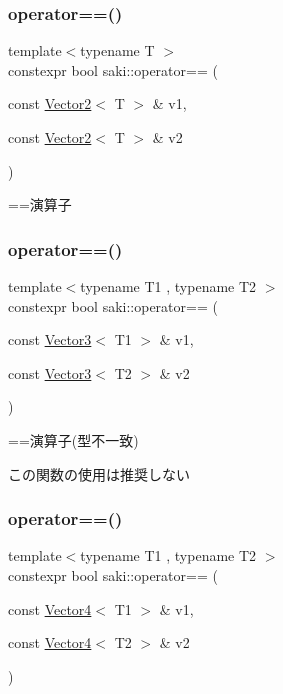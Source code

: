 \subsubsection{\texorpdfstring{operator==()}{operator==()}\hspace{0.1cm}{\footnotesize\ttfamily [5/10]}}
{\footnotesize\ttfamily template$<$typename T $>$ \\
constexpr bool saki\+::operator== (\begin{DoxyParamCaption}\item[{const \mbox{\hyperlink{classsaki_1_1_vector2}{Vector2}}$<$ T $>$ \&}]{v1,  }\item[{const \mbox{\hyperlink{classsaki_1_1_vector2}{Vector2}}$<$ T $>$ \&}]{v2 }\end{DoxyParamCaption})}



==演算子 

\mbox{\label{namespacesaki_a487f0b513be6d4a0aecafeec28b6fc69}} 
\subsubsection{\texorpdfstring{operator==()}{operator==()}\hspace{0.1cm}{\footnotesize\ttfamily [6/10]}}
{\footnotesize\ttfamily template$<$typename T1 , typename T2 $>$ \\
constexpr bool saki\+::operator== (\begin{DoxyParamCaption}\item[{const \mbox{\hyperlink{classsaki_1_1_vector3}{Vector3}}$<$ T1 $>$ \&}]{v1,  }\item[{const \mbox{\hyperlink{classsaki_1_1_vector3}{Vector3}}$<$ T2 $>$ \&}]{v2 }\end{DoxyParamCaption})}



==演算子(型不一致) 

この関数の使用は推奨しない \mbox{\label{namespacesaki_a3c0f3a38ce313956032cd123f702b7a5}} 
\subsubsection{\texorpdfstring{operator==()}{operator==()}\hspace{0.1cm}{\footnotesize\ttfamily [7/10]}}
{\footnotesize\ttfamily template$<$typename T1 , typename T2 $>$ \\
constexpr bool saki\+::operator== (\begin{DoxyParamCaption}\item[{const \mbox{\hyperlink{classsaki_1_1_vector4}{Vector4}}$<$ T1 $>$ \&}]{v1,  }\item[{const \mbox{\hyperlink{classsaki_1_1_vector4}{Vector4}}$<$ T2 $>$ \&}]{v2 }\end{DoxyParamCaption})}



